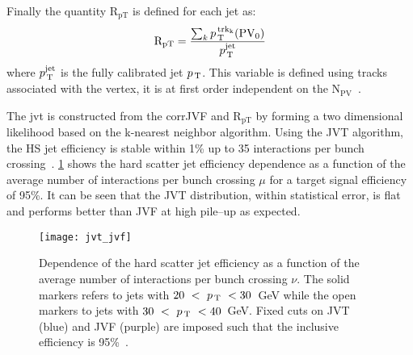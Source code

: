 Finally the quantity $\mathrm{R_{pT}}$ is defined for each jet as:
\begin{equation}
  \label{eq:79}
  \mathrm{R_{pT}} = \frac{\sum_k p_\mathrm{\, T}^\mathrm{\, trk_k}
    (\mathrm{PV_0})}{p_\mathrm{\, T}^{\mathrm{jet}}}
\end{equation}
where $p_\mathrm{\, T}^{\mathrm{jet}}$ is the fully calibrated jet $p_\mathrm{\, T}$. This variable is
defined using tracks associated with the vertex, it is at first order
independent on the N$_{\mathrm{PV}}$~\cite{PileUpPerformance}.

The \gls{jvt} is constructed from the corrJVF and $\mathrm{R_{pT}}$ by forming a
two dimensional likelihood based on the k-nearest neighbor algorithm. Using the
JVT algorithm, the HS jet efficiency is stable within 1\% up to 35 interactions
per bunch crossing~\cite{JVT}. \cref{fig:jvt_jvf} shows the hard scatter jet
efficiency dependence as a function of the average number of interactions per
bunch crossing $\mu$ for a target signal efficiency of 95\%. It can be seen that
the JVT distribution, within statistical error, is flat and performs better than
JVF at high pile--up as expected.
\begin{figure}[!h]
  \centering
    \texttt{[image: jvt\_jvf]}
    \caption{Dependence of the hard scatter jet efficiency as a function of the
      average number of interactions per bunch crossing $\nu$. The solid markers
    refers to jets with $20~<~p_\mathrm{\, T}~<30$~GeV while the open markers to jets with
    $30~<~p_\mathrm{\, T}~<40$~GeV. Fixed cuts on JVT (blue) and JVF (purple) are imposed
    such that the inclusive efficiency is 95\%~\cite{JVT}.}
    \label{fig:jvt_jvf}
\end{figure}
